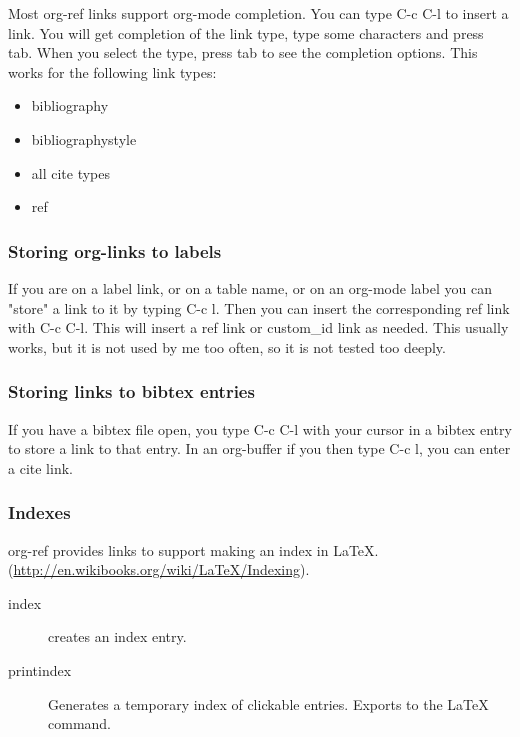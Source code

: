 \documentclass[11pt]{article}
\begin{document}
{Most org-ref links support org-mode completion. You can type C-c C-l to insert a link. You will get completion of the link type, type some characters and press tab. When you select the type, press tab to see the completion options. This works for the following link types:

\begin{itemize}
\item bibliography
\item bibliographystyle
\item all cite types
\item ref
\end{itemize}

\subsubsection{Storing org-links to labels}
\label{sec:orgheadline32}

If you are on a label link, or on a table name, or on an org-mode label you can "store" a link to it by typing C-c l. Then you can insert the corresponding ref link with C-c C-l. This will insert a ref link or custom\_id link as needed. This usually works, but it is not used by me too often, so it is not tested too deeply.

\subsubsection{Storing links to bibtex entries}
\label{sec:orgheadline33}
If you have a bibtex file open, you type C-c C-l with your cursor in a bibtex entry to store a link to that entry. In an org-buffer if you then type C-c l, you can enter a cite link.

\subsubsection{Indexes}
\label{sec:orgheadline34}

org-ref provides links to support making an index in \LaTeX{}. (\url{http://en.wikibooks.org/wiki/LaTeX/Indexing}).

\begin{description}
\item[{index}] creates an index entry.
\item[{printindex}] Generates a temporary index of clickable entries. Exports to the \LaTeX{} command.
\end{description}

}
\end{document}
